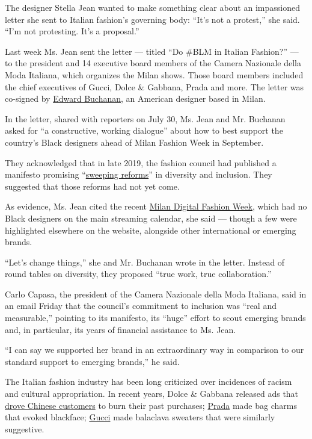The designer Stella Jean wanted to make something clear about an
impassioned letter she sent to Italian fashion's governing body: ``It's
not a protest,'' she said. ``I'm not protesting. It's a proposal.''

Last week Ms. Jean sent the letter --- titled ``Do \#BLM in Italian
Fashion?'' --- to the president and 14 executive board members of the
Camera Nazionale della Moda Italiana, which organizes the Milan shows.
Those board members included the chief executives of Gucci, Dolce \&
Gabbana, Prada and more. The letter was co-signed by
\href{https://www.nytimes3xbfgragh.onion/2019/02/21/fashion/milan-edward-buchanan-race.html}{Edward
Buchanan}, an American designer based in Milan.

In the letter, shared with reporters on July 30, Ms. Jean and Mr.
Buchanan asked for ``a constructive, working dialogue'' about how to
best support the country's Black designers ahead of Milan Fashion Week
in September.

They acknowledged that in late 2019, the fashion council had published a
manifesto promising
``\href{https://www.cameramoda.it/en/associazione/news/1588/}{sweeping
reforms}'' in diversity and inclusion. They suggested that those reforms
had not yet come.

As evidence, Ms. Jean cited the recent
\href{https://www.nytimes3xbfgragh.onion/2020/07/13/fashion/milan-digital-fashion-week-video-stream.html}{Milan
Digital Fashion Week}, which had no Black designers on the main
streaming calendar, she said --- though a few were highlighted elsewhere
on the website, alongside other international or emerging brands.

``Let's change things,'' she and Mr. Buchanan wrote in the letter.
Instead of round tables on diversity, they proposed ``true work, true
collaboration.''

Carlo Capasa, the president of the Camera Nazionale della Moda Italiana,
said in an email Friday that the council's commitment to inclusion was
``real and measurable,'' pointing to its manifesto, its ``huge'' effort
to scout emerging brands and, in particular, its years of financial
assistance to Ms. Jean.

``I can say we supported her brand in an extraordinary way in comparison
to our standard support to emerging brands,'' he said.

The Italian fashion industry has been long criticized over incidences of
racism and cultural appropriation. In recent years, Dolce \& Gabbana
released ads that
\href{https://www.nytimes3xbfgragh.onion/2018/11/23/fashion/dolce-gabbana-china-disaster-backlash.html}{drove
Chinese customers} to burn their past purchases;
\href{https://www.nytimes3xbfgragh.onion/2020/02/04/style/Prada-racism-City-Commission-on-Human-Rights.html}{Prada}
made bag charms that evoked blackface;
\href{https://www.nytimes3xbfgragh.onion/2019/02/07/business/gucci-blackface-adidas-apologize.html}{Gucci}
made balaclava sweaters that were similarly suggestive.

